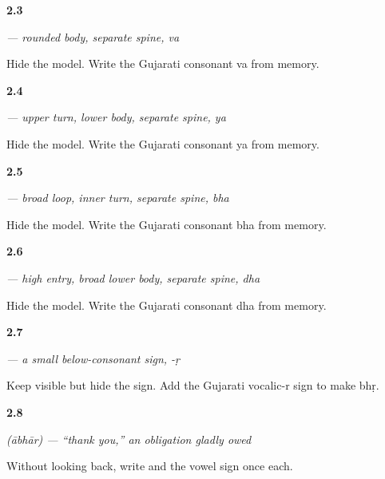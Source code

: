 \noindent\begin{minipage}[t]{\linewidth}
\raggedright
\hypertarget{review-GU-W02-va-recall}{\textbf{2.3}} \emph{ — rounded body, separate spine, va}\par
\small Hide the model. Write the Gujarati consonant va from memory.
\end{minipage}\par\medskip

\noindent\begin{minipage}[t]{\linewidth}
\raggedright
\hypertarget{review-GU-W02-ya-recall}{\textbf{2.4}} \emph{ — upper turn, lower body, separate spine, ya}\par
\small Hide the model. Write the Gujarati consonant ya from memory.
\end{minipage}\par\medskip

\noindent\begin{minipage}[t]{\linewidth}
\raggedright
\hypertarget{review-GU-W02-bha-recall}{\textbf{2.5}} \emph{ — broad loop, inner turn, separate spine, bha}\par
\small Hide the model. Write the Gujarati consonant bha from memory.
\end{minipage}\par\medskip

\noindent\begin{minipage}[t]{\linewidth}
\raggedright
\hypertarget{review-GU-W02-dha-recall}{\textbf{2.6}} \emph{ — high entry, broad lower body, separate spine, dha}\par
\small Hide the model. Write the Gujarati consonant dha from memory.
\end{minipage}\par\medskip

\noindent\begin{minipage}[t]{\linewidth}
\raggedright
\hypertarget{review-GU-W02-vocalic-r-recall}{\textbf{2.7}} \emph{ — a small below-consonant sign, -ṛ}\par
\small Keep  visible but hide the sign. Add the Gujarati vocalic-r sign to make bhṛ.
\end{minipage}\par\medskip

\noindent\begin{minipage}[t]{\linewidth}
\raggedright
\hypertarget{review-GU-C01-aabhaar-script-retrieval}{\textbf{2.8}} \emph{ (ābhār) — \textquotedblleft{}thank you,\textquotedblright{} an obligation gladly owed}\par
\small Without looking back, write  and the vowel sign  once each.
\end{minipage}\par\medskip

